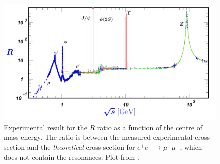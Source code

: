 \documentclass[12pt]{article}
\begin{document}
\begin{figure}
\begin{center}
\includegraphics[scale=0.3]{images/RratioExp.png}
\end{center}
\caption{Experimental result for the $R$ ratio as a function of the centre of mass energy. The ratio is between the measured experimental cross section and the \emph{theoretical} cross section for $e^+e^-\rightarrow\mu^+\mu^-$, which does not contain the resonances. Plot from \cite{pdg}.}\label{fig:RratioExp}
\end{figure}
\end{document}

